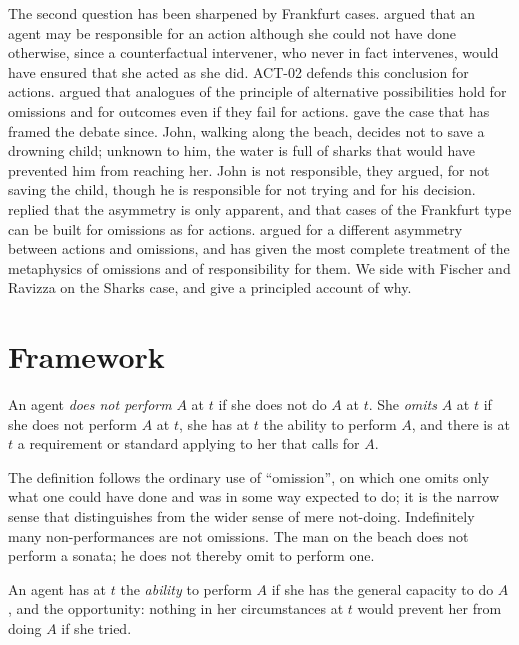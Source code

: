 \documentclass{situationist-preprint}
\begin{document}
The second question has been sharpened by Frankfurt cases. \citet{Frankfurt1969} argued that an agent may be responsible for an action although she could not have done otherwise, since a counterfactual intervener, who never in fact intervenes, would have ensured that she acted as she did. ACT-02 defends this conclusion for actions. \citet{vanInwagen1978} argued that analogues of the principle of alternative possibilities hold for omissions and for outcomes even if they fail for actions. \citet{FischerRavizza1991} gave the case that has framed the debate since. John, walking along the beach, decides not to save a drowning child; unknown to him, the water is full of sharks that would have prevented him from reaching her. John is not responsible, they argued, for not saving the child, though he is responsible for not trying and for his decision. \citet{Frankfurt1994} replied that the asymmetry is only apparent, and that cases of the Frankfurt type can be built for omissions as for actions. \citet{Sartorio2005} argued for a different asymmetry between actions and omissions, and \citet{Clarke2014} has given the most complete treatment of the metaphysics of omissions and of responsibility for them. We side with Fischer and Ravizza on the Sharks case, and give a principled account of why.

\section{Framework}

\begin{definition}\label{d:omission}
An agent \emph{does not perform} $A$ at $t$ if she does not do $A$ at $t$. She \emph{omits} $A$ at $t$ if she does not perform $A$ at $t$, she has at $t$ the ability to perform $A$, and there is at $t$ a requirement or standard applying to her that calls for $A$.
\end{definition}

The definition follows the ordinary use of \enquote{omission}, on which one omits only what one could have done and was in some way expected to do; it is the narrow sense that \citet{Clarke2014} distinguishes from the wider sense of mere not-doing. Indefinitely many non-performances are not omissions. The man on the beach does not perform a sonata; he does not thereby omit to perform one.

\begin{definition}[Ability]\label{d:ability}
An agent has at $t$ the \emph{ability} to perform $A$ if she has the general capacity to do $A$, and the opportunity: nothing in her circumstances at $t$ would prevent her from doing $A$ if she tried.
\end{definition}
\end{document}
